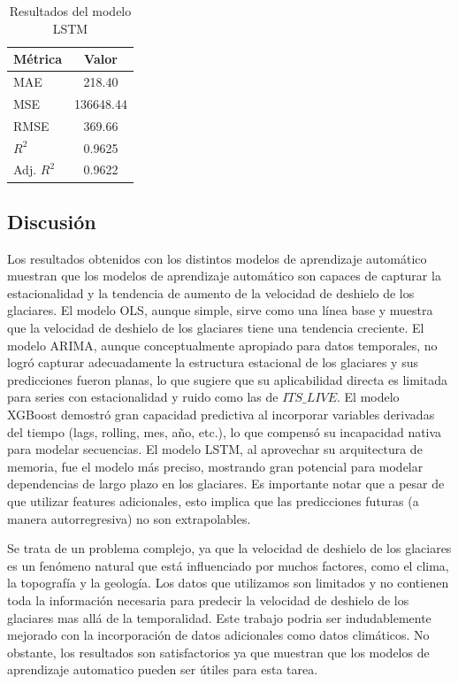 \documentclass[sigconf,language=spanish]{acmart}
\begin{document}
\begin{table}[H]
  \caption{Resultados del modelo LSTM}
  \label{tab:lstm}
  \begin{tabular}{lc}
    \toprule
    Métrica & Valor \\
    \midrule
    MAE & 218.40 \\
    MSE & 136648.44 \\
    RMSE & 369.66 \\
    $R^2$ & 0.9625 \\
    Adj. $R^2$ & 0.9622 \\
    \bottomrule
  \end{tabular}
\end{table}

\subsection{Discusión}

Los resultados obtenidos con los distintos modelos de aprendizaje automático muestran que los modelos de aprendizaje automático son capaces de capturar la estacionalidad y la tendencia de aumento de la velocidad de deshielo de los glaciares.
El modelo OLS, aunque simple, sirve como una línea base y muestra que la velocidad de deshielo de los glaciares tiene una tendencia creciente.
El modelo ARIMA, aunque conceptualmente apropiado para datos temporales, no logró capturar adecuadamente la estructura estacional de los glaciares y sus predicciones fueron planas, lo que sugiere que su aplicabilidad directa es limitada para series con estacionalidad y ruido como las de  $ITS\_LIVE$.
El modelo XGBoost demostró gran capacidad predictiva al incorporar variables derivadas del tiempo (lags, rolling, mes, año, etc.), lo que compensó su incapacidad nativa para modelar secuencias.
El modelo LSTM, al aprovechar su arquitectura de memoria, fue el modelo más preciso, mostrando gran potencial para modelar dependencias de largo plazo en los glaciares.
Es importante notar que a pesar de que utilizar features adicionales, esto implica que las predicciones futuras (a manera autorregresiva) no son extrapolables.

Se trata de un problema complejo, ya que la velocidad de deshielo de los glaciares es un fenómeno natural que está influenciado por muchos factores, como el clima, la topografía y la geología.
Los datos que utilizamos son limitados y no contienen toda la información necesaria para predecir la velocidad de deshielo de los glaciares mas allá de la temporalidad.
Este trabajo podria ser indudablemente mejorado con la incorporación de datos adicionales como datos climáticos. 
No obstante, los resultados son satisfactorios ya que muestran que los modelos de aprendizaje automatico pueden ser útiles para esta tarea.
\end{document}
